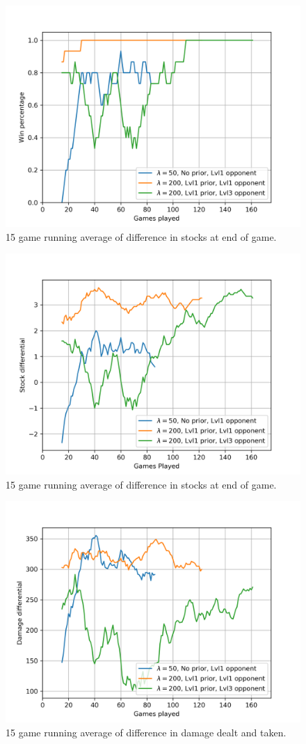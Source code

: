 \begin{figure}[!htb]
\centering
	\includegraphics[width=120mm]{winpctg.png}
	\caption{15 game running average of difference in stocks at end of game. \label{winpctg}}
\end{figure}

\begin{figure}[!htb]
\centering
	\includegraphics[width=120mm]{stocks.png}
	\caption{15 game running average of difference in stocks at end of game. \label{stocks}}
\end{figure}

\begin{figure}[!htb]
\centering
	\includegraphics[width=120mm]{damage.png}
	\caption{15 game running average of difference in damage dealt and taken. \label{damage}}
\end{figure}